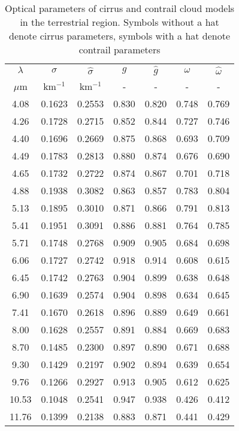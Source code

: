 \documentclass[agp]{svjour}
\begin{document}
\begin{appendix}
\begin{table}
\caption[]{Optical parameters of cirrus and contrail cloud models in the
terrestrial region. Symbols without a hat denote cirrus parameters,
symbols with a hat denote contrail parameters}
\begin{tabular*}{84.22mm}{@{\hspace{0pt}\extracolsep{\fill}}ccccccc@{\hspace{0pt}}}
\hline
\noalign{\smallskip}
$\lambda$& $\sigma$ & $\hat{\sigma}$ & $g$ & $\hat{g}$ & $\omega $ & $\hat{\omega}$ \\
$\mu$m & km$^{-1}$ & km$^{-1}$ &-&-&-&-\\
\noalign{\smallskip}
\hline
\noalign{\smallskip}
\phantom{1}4.08 &0.1623 &0.2553 &0.830 &0.820 &0.748 &0.769 \\
\phantom{1}4.26 &0.1728 &0.2715 &0.852 &0.844 &0.727 &0.746 \\
\phantom{1}4.40 &0.1696 &0.2669 &0.875 &0.868 &0.693 &0.709 \\
\phantom{1}4.49 &0.1783 &0.2813 &0.880 &0.874 &0.676 &0.690 \\
\phantom{1}4.65 &0.1732 &0.2722 &0.874 &0.867 &0.701 &0.718 \\
\phantom{1}4.88 &0.1938 &0.3082 &0.863 &0.857 &0.783 &0.804 \\
\phantom{1}5.13 &0.1895 &0.3010 &0.871 &0.866 &0.791 &0.813 \\
\phantom{1}5.41 &0.1951 &0.3091 &0.886 &0.881 &0.764 &0.785 \\
\phantom{1}5.71 &0.1748 &0.2768 &0.909 &0.905 &0.684 &0.698 \\
\phantom{1}6.06 &0.1727 &0.2742 &0.918 &0.914 &0.608 &0.615 \\
\phantom{1}6.45 &0.1742 &0.2763 &0.904 &0.899 &0.638 &0.648 \\
\phantom{1}6.90 &0.1639 &0.2574 &0.904 &0.898 &0.634 &0.645 \\
\phantom{1}7.41 &0.1670 &0.2618 &0.896 &0.889 &0.649 &0.661 \\
\phantom{1}8.00 &0.1628 &0.2557 &0.891 &0.884 &0.669 &0.683 \\
\phantom{1}8.70 &0.1485 &0.2300 &0.897 &0.890 &0.671 &0.688 \\
\phantom{1}9.30 &0.1429 &0.2197 &0.902 &0.894 &0.639 &0.654 \\
\phantom{1}9.76 &0.1266 &0.2927 &0.913 &0.905 &0.612 &0.625 \\
10.53 &0.1048 &0.2541 &0.947 &0.938 &0.426 &0.412 \\
11.76 &0.1399 &0.2138 &0.883 &0.871 &0.441 &0.429 \\

\end{tabular*}
\end{table}
\end{appendix}
\end{document}
